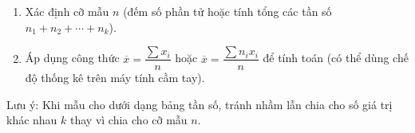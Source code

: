 \begin{enumerate}
\item Xác định cỡ mẫu $n$ (đếm số phần tử hoặc tính tổng các tần số $n_1 + n_2 + \cdots + n_k$).
\item Áp dụng công thức $\overline{x} = \dfrac{\sum x_i}{n}$ hoặc $\overline{x} = \dfrac{\sum n_i x_i}{n}$ để tính toán (có thể dùng chế độ thống kê trên máy tính cầm tay).
\end{enumerate}
Lưu ý: Khi mẫu cho dưới dạng bảng tần số, tránh nhầm lẫn chia cho số giá trị khác nhau $k$ thay vì chia cho cỡ mẫu $n$.
